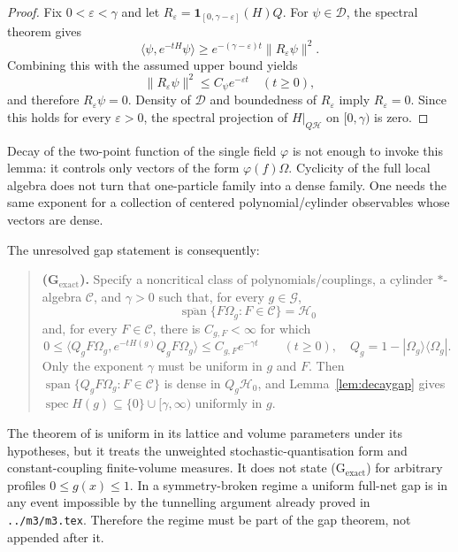 \documentclass[11pt,a4paper]{article}
\theoremstyle{remark}
\newcommand{\Hh}{\mathcal H_0}
\newcommand{\Om}{\Omega}
\newcommand{\G}{\mathcal G}
\DeclareMathOperator{\spec}{spec}
\begin{document}
\begin{proof}
Fix $0<\varepsilon<\gamma$ and let
$R_\varepsilon=\mathbf1_{[0,\gamma-\varepsilon]}(H)Q$.  For $\psi\in\mathscr D$, the spectral
theorem gives
\[
 \langle\psi,e^{-tH}\psi\rangle
 \ge e^{-(\gamma-\varepsilon)t}\|R_\varepsilon\psi\|^2.
\]
Combining this with the assumed upper bound yields
\[
 \|R_\varepsilon\psi\|^2\le C_\psi e^{-\varepsilon t}
 \quad(t\ge0),
\]
and therefore $R_\varepsilon\psi=0$.  Density of $\mathscr D$ and boundedness of
$R_\varepsilon$ imply $R_\varepsilon=0$.  Since this holds for every $\varepsilon>0$, the spectral
projection of $H|_{Q\mathcal H}$ on $[0,\gamma)$ is zero.
\end{proof}

Decay of the two-point function of the single field $\varphi$ is not enough to invoke this lemma:
it controls only vectors of the form $\varphi(f)\Om$.  Cyclicity of the full local algebra does not
turn that one-particle family into a dense family.  One needs the same exponent for a collection
of centered polynomial/cylinder observables whose vectors are dense.

The unresolved gap statement is consequently:

\begin{quote}
\textbf{(G$_\mathrm{exact}$).} Specify a noncritical class of polynomials/couplings, a cylinder
$*$-algebra $\mathscr C$, and $\gamma>0$ such that, for every $g\in\G$,
\[
 \overline{\operatorname{span}}\{F\Om_g:F\in\mathscr C\}=\Hh
\]
and, for every $F\in\mathscr C$, there is $C_{g,F}<\infty$ for which
\[
 0\le
 \langle Q_gF\Om_g,e^{-tH(g)}Q_gF\Om_g\rangle
 \le C_{g,F}e^{-\gamma t}
 \qquad(t\ge0),
 \quad Q_g=1-|\Om_g\rangle\langle\Om_g|.
\]
Only the exponent $\gamma$ must be uniform in $g$ and $F$.  Then
$\operatorname{span}\{Q_gF\Om_g:F\in\mathscr C\}$ is dense in $Q_g\Hh$, and
Lemma~\ref{lem:decaygap} gives
$\spec H(g)\subseteq\{0\}\cup[\gamma,\infty)$ uniformly in $g$.
\end{quote}

The theorem of \cite{BD} is uniform in its lattice and volume parameters under its hypotheses,
but it treats the unweighted stochastic-quantisation form and constant-coupling finite-volume
measures.  It does not state (G$_\mathrm{exact}$) for arbitrary profiles $0\le g(x)\le1$.
In a symmetry-broken regime a uniform full-net gap is in any event impossible by the tunnelling
argument already proved in \texttt{../m3/m3.tex}.  Therefore the regime must be part of the gap
theorem, not appended after it.
\end{document}
